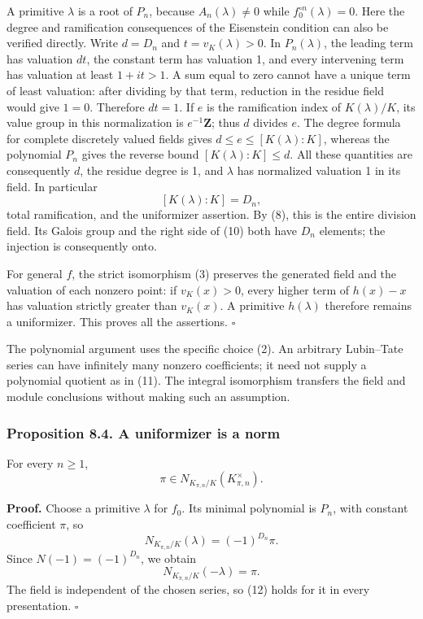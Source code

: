 \documentclass[11pt,a4paper]{article}
\begin{document}
A primitive \(\lambda\) is a root of \(P_n\), because
\(A_n(\lambda)\ne0\) while \(f_0^{\circ n}(\lambda)=0\). Here the degree
and ramification consequences of the Eisenstein condition can also be
verified directly. Write \(d=D_n\) and \(t=v_K(\lambda)>0\). In
\(P_n(\lambda)\), the leading term has valuation \(dt\), the constant
term has valuation 1, and every intervening term has valuation at least
\(1+it>1\). A sum equal to zero cannot have a unique term of least
valuation: after dividing by that term, reduction in the residue field
would give \(1=0\). Therefore \(dt=1\). If \(e\) is the ramification
index of \(K(\lambda)/K\), its value group in this normalization is
\(e^{-1}\mathbf Z\); thus \(d\) divides \(e\). The degree formula for
complete discretely valued fields gives \(d\leq e\leq[K(\lambda):K]\),
whereas the polynomial \(P_n\) gives the reverse bound
\([K(\lambda):K]\leq d\). All these quantities are consequently \(d\),
the residue degree is 1, and \(\lambda\) has normalized valuation 1 in
its field. In particular \[
[K(\lambda):K]=D_n,
\] total ramification, and the uniformizer assertion. By (8), this is
the entire division field. Its Galois group and the right side of (10)
both have \(D_n\) elements; the injection is consequently onto.

For general \(f\), the strict isomorphism (3) preserves the generated
field and the valuation of each nonzero point: if \(v_K(x)>0\), every
higher term of \(h(x)-x\) has valuation strictly greater than
\(v_K(x)\). A primitive \(h(\lambda)\) therefore remains a uniformizer.
This proves all the assertions. \(\square\)

The polynomial argument uses the specific choice (2). An arbitrary
Lubin--Tate series can have infinitely many nonzero coefficients; it
need not supply a polynomial quotient as in (11). The integral
isomorphism transfers the field and module conclusions without making
such an assumption.

\subsubsection{Proposition 8.4. A uniformizer is a
norm}\label{proposition-8.4.-a-uniformizer-is-a-norm}

For every \(n\geq1\), \[
\pi\in N_{K_{\pi,n}/K}(K_{\pi,n}^{\times}).
\tag{12}
\]

\textbf{Proof.} Choose a primitive \(\lambda\) for \(f_0\). Its minimal
polynomial is \(P_n\), with constant coefficient \(\pi\), so \[
N_{K_{\pi,n}/K}(\lambda)=(-1)^{D_n}\pi.
\] Since \(N(-1)=(-1)^{D_n}\), we obtain \[
N_{K_{\pi,n}/K}(-\lambda)=\pi.
\tag{13}
\] The field is independent of the chosen series, so (12) holds for it
in every presentation. \(\square\)
\end{document}
